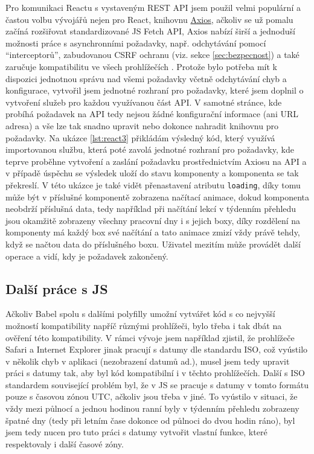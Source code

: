     Pro komunikaci Reactu s vystaveným REST API jsem použil velmi populární a častou volbu vývojářů nejen pro React, knihovnu \href{https://github.com/axios/axios}{Axios}, ačkoliv se už pomalu začíná rozšiřovat standardizované JS Fetch API, Axios nabízí širší a jednoduší možnosti práce s asynchronními požadavky, např. odchytávání pomocí \enquote{interceptorů}, zabudovanou CSRF ochranu (viz. sekce \ref{sec:bezpecnost}) a také zaručuje kompatibilitu ve všech prohlížečích \cite{axios}. Protože bylo potřeba mít k dispozici jednotnou správu nad všemi požadavky včetně odchytávání chyb a konfigurace, vytvořil jsem jednotné rozhraní pro požadavky, které jsem doplnil o vytvoření služeb pro každou využívanou část API. V samotné stránce, kde probíhá požadavek na API tedy nejsou žádné konfigurační informace (ani URL adresa) a vše lze tak snadno upravit nebo dokonce nahradit knihovnu pro požadavky. Na ukázce \ref{lst:react3} přikládám výsledný kód, který využívá importovanou službu, která poté zavolá jednotné rozhraní pro požadavky, kde teprve proběhne vytvoření a zaslání požadavku prostřednictvím Axiosu na API a v případě úspěchu se výsledek uloží do stavu komponenty a komponenta se tak překreslí. V této ukázce je také vidět přenastavení atributu \verb|loading|, díky tomu může být v příslušné komponentě zobrazena načítací animace, dokud komponenta neobdrží příslušná data, tedy například při načítání lekcí v týdenním přehledu jsou okamžitě zobrazeny všechny pracovní dny i s jejich boxy, díky rozdělení na komponenty má každý box své načítání a tato animace zmizí vždy právě tehdy, když se načtou data do příslušného boxu. Uživatel mezitím může provádět další operace a vidí, kdy je požadavek zakončený.
    
    \subsection{Další práce s JS}
    Ačkoliv Babel spolu s dalšími polyfilly umožní vytvářet kód s co nejvyšší možností kompatibility napříč různými prohlížeči, bylo třeba i tak dbát na ověření této kompatibility. V rámci vývoje jsem například zjistil, že prohlížeče Safari a Internet Explorer jinak pracují s datumy dle standardu ISO, což vyústilo v několik chyb v aplikaci (nezobrazení datumů ad.), musel jsem tedy upravit práci s datumy tak, aby byl kód kompatibilní i v těchto prohlížečích. Další s ISO standardem související problém byl, že v JS se pracuje s datumy v tomto formátu pouze s časovou zónou UTC, ačkoliv jsou třeba v jiné. To vyústilo v situaci, že vždy mezi půlnocí a jednou hodinou ranní byly v týdenním přehledu zobrazeny špatné dny (tedy při letním čase dokonce od půlnoci do dvou hodin ráno), byl jsem tedy nucen pro tuto práci s datumy vytvořit vlastní funkce, které respektovaly i další časové zóny.
    
